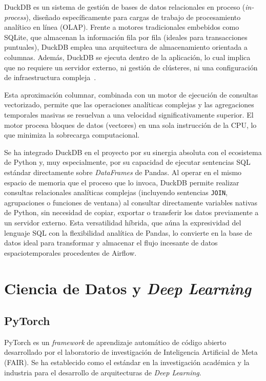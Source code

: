 DuckDB es un sistema de gestión de bases de datos relacionales en proceso (\textit{in-process}), diseñado específicamente para cargas de trabajo de procesamiento analítico en línea (OLAP). Frente a motores tradicionales embebidos como SQLite, que almacenan la información fila por fila (ideales para transacciones puntuales), DuckDB emplea una arquitectura de almacenamiento orientada a columnas. Además, DuckDB se ejecuta dentro de la aplicación, lo cual implica que no requiere un servidor externo, ni gestión de clústeres, ni una configuración de infraestructura compleja~\cite{raasveldt2019duckdb}.

Esta aproximación columnar, combinada con un motor de ejecución de consultas vectorizado, permite que las operaciones analíticas complejas y las agregaciones temporales masivas se resuelvan a una velocidad significativamente superior. El motor procesa bloques de datos (vectores) en una sola instrucción de la CPU, lo que minimiza la sobrecarga computacional.

Se ha integrado DuckDB en el proyecto por su sinergia absoluta con el ecosistema de Python y, muy especialmente, por su capacidad de ejecutar sentencias SQL estándar directamente sobre \textit{DataFrames} de Pandas. Al operar en el mismo espacio de memoria que el proceso que lo invoca, DuckDB permite realizar consultas relacionales analíticas complejas (incluyendo sentencias \texttt{JOIN}, agrupaciones o funciones de ventana) al consultar directamente variables nativas de Python, sin necesidad de copiar, exportar o transferir los datos previamente a un servidor externo. Esta versatilidad híbrida, que aúna la expresividad del lenguaje SQL con la flexibilidad analítica de Pandas, lo convierte en la base de datos ideal para transformar y almacenar el flujo incesante de datos espaciotemporales procedentes de Airflow.





\section{Ciencia de Datos y \textit{Deep Learning}}
\label{sec:deep_learning}

\subsection{PyTorch}
\label{subsec:pytorch}

PyTorch es un \textit{framework} de aprendizaje automático de código abierto desarrollado por el laboratorio de investigación de Inteligencia Artificial de Meta (FAIR). Se ha establecido como el estándar en la investigación académica y la industria para el desarrollo de arquitecturas de \textit{Deep Learning}.

